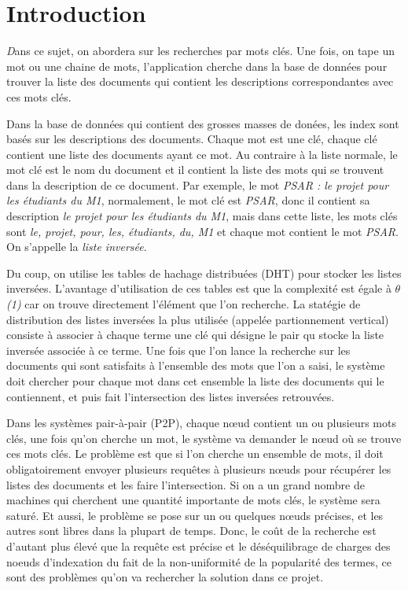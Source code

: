 
\chapter{Introduction}
	{\huge \itshape D}ans ce sujet, on abordera sur les recherches par mots clés. Une fois, on tape un mot ou une chaine de mots, l'application cherche dans la base de données pour trouver la liste des documents qui contient les descriptions correspondantes avec ces mots clés.
	
	Dans la base de données qui contient des grosses masses de donées, les index sont basés sur les descriptions des documents. Chaque mot est une clé, chaque clé contient une liste des documents ayant ce mot. Au contraire à la liste normale, le mot clé est le nom du document et il contient la liste des mots qui se trouvent dans la description de ce document. Par exemple, le mot {\em PSAR : le projet pour les étudiants du M1}, normalement, le mot clé est {\em PSAR}, donc il contient sa description {\em le projet pour les étudiants du M1}, mais dans cette liste, les mots clés sont {\em le, projet, pour, les, étudiants, du, M1} et chaque mot contient le mot {\em PSAR}. On s'appelle la {\em liste inversée}.
	
	Du coup, on utilise les tables de hachage distribuées (DHT) pour stocker les listes inversées. L'avantage d'utilisation de ces tables est que la complexité est égale à $ \theta ${\em (1)} car on trouve directement l'élément que l'on recherche. La statégie de distribution des listes inversées la plus utilisée (appelée partionnement vertical) consiste à associer à chaque terme une clé qui désigne le pair qu stocke la liste inversée associée à ce terme. Une fois que l'on lance la recherche sur les documents qui sont satisfaits à l'ensemble des mots que l'on a saisi, le système doit chercher pour chaque mot dans cet ensemble la liste des documents qui le contiennent, et puis fait l'intersection des listes inversées retrouvées. 

	Dans les systèmes pair-à-pair (P2P), chaque n{\oe}ud contient un ou plusieurs mots clés, une fois qu'on cherche un mot, le système va demander le n{\oe}ud où se trouve ces mots clés. Le problème est que si l'on cherche un ensemble de mots, il doit obligatoirement envoyer plusieurs requêtes à plusieurs n{\oe}uds pour récupérer les listes des documents et les faire l'intersection. Si on a un grand nombre de machines qui cherchent une quantité importante de mots clés, le système sera saturé. Et aussi, le problème se pose sur un ou quelques n{\oe}uds précises, et les autres sont libres dans la plupart de temps. Donc, le coût de la recherche est d'autant plus élevé que la requête est précise et le déséquilibrage de charges des noeuds d'indexation du fait de la non-uniformité de la popularité des termes, ce sont des problèmes qu'on va rechercher la solution dans ce projet.
	
	